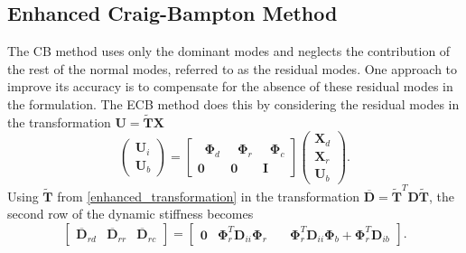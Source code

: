 %
%

\subsection{Enhanced Craig-Bampton Method}
\label{ssec: ECB method}

The CB method uses only the dominant modes and neglects the contribution of the rest of the normal modes, referred to as the residual modes.
One approach to improve its accuracy is to compensate for the absence of these residual modes in the formulation.
{The ECB method does this by considering the residual modes in the transformation $\mathbf{U}=\tilde{\mathbf{T}}\mathbf{X}$}%
\begin{equation}
    \begin{pmatrix}
        \mathbf{U}_{i} \\
        \mathbf{U}_{b}
    \end{pmatrix}
    =
    \begin{bmatrix}
        \;\;\mathbf{\Phi}_{d}
        & 
        \;\;\mathbf{\Phi}_{r}
        &
        \;\;\mathbf{\Phi}_{c} \\
        \mathbf{0} & \mathbf{0} & \mathbf{I}
    \end{bmatrix}
    \begin{pmatrix}
        \mathbf{X}_{d} \\
        \mathbf{X}_{r} \\
        \mathbf{U}_{b}
    \end{pmatrix}.
    \label{enhanced_transformation}
\end{equation}
{Using $\tilde{\mathbf{T}}$ from \eqref{enhanced_transformation} in the transformation $\overline{\mathbf{D}}=\tilde{\mathbf{T}}^{T}\mathbf{D}\tilde{\mathbf{T}}$, the second row of the dynamic stiffness becomes}%
\begin{equation}
    \begin{bmatrix}
        \overline{\mathbf{D}}_{rd} &
        \overline{\mathbf{D}}_{rr} &
        \overline{\mathbf{D}}_{rc} 
    \end{bmatrix}
    =
    \begin{bmatrix}
        \mathbf{0}
        &
        \mathbf{\Phi}_{r}^{T}
        \mathbf{D}_{ii}
        \mathbf{\Phi}_{r}
        \quad
        &
        \mathbf{\Phi}_{r}^{T}
        \mathbf{D}_{ii}
        \mathbf{\Phi}_{b}
        +
        \mathbf{\Phi}_{r}^{T}
        \mathbf{D}_{ib}
    \end{bmatrix}.
\end{equation}
